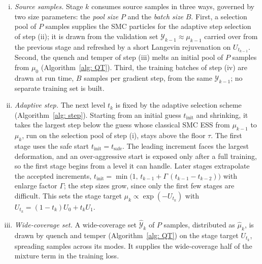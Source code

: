 \documentclass{article}
\begin{document}
\begin{enumerate}[(i)]
\item \emph{Source samples.} Stage $k$ consumes source samples in three ways, governed by two size parameters: the \emph{pool size} $P$ and the \emph{batch size} $B$. First, a selection pool of $P$ samples supplies the SMC particles for the adaptive step selection of step (ii); it is drawn from the validation set $\mathcal Y_{k-1}\approx\mu_{k-1}$ carried over from the previous stage and refreshed by a short Langevin rejuvenation on $U_{t_{k-1}}$. Second, the quench and temper of step (iii) melts an initial pool of $P$ samples from $\mu_0$ (Algorithm~\ref{alg: QT}). Third, the training batches of step (iv) are drawn at run time, $B$ samples per gradient step, from the same $\mathcal Y_{k-1}$; no separate training set is built.

\item \emph{Adaptive step.} The next level $t_k$ is fixed by the adaptive selection scheme (Algorithm~\ref{alg: step}). Starting from an initial guess $t_{\mathrm{init}}$ and shrinking, it takes the largest step below the guess whose classical SMC ESS from $\mu_{k-1}$ to $\mu_k$, run on the selection pool of step (i), stays above the floor $\tau$. The first stage uses the safe start $t_{\mathrm{init}} = t_{\mathrm{safe}}$. The leading increment faces the largest deformation, and an over-aggressive start is exposed only after a full training, so the first stage begins from a level it can handle. Later stages extrapolate the accepted increments, $t_{\mathrm{init}} = \min\bigl(1,\, t_{k-1} + \Gamma\,(t_{k-1} - t_{k-2})\bigr)$ with enlarge factor $\Gamma$; the step sizes grow, since only the first few stages are difficult. This sets the stage target $\mu_k \propto \exp(-U_{t_k})$ with $U_{t_k} = (1-t_k)U_0 + t_k U_1$.

\item \emph{Wide-coverage set.} A wide-coverage set $\hat{\mathcal Y}_k$ of $P$ samples, distributed as $\hat\mu_k$, is drawn by quench and temper (Algorithm~\ref{alg: QT}) on the stage target $U_{t_k}$, spreading samples across its modes. It supplies the wide-coverage half of the mixture term in the training loss.


\end{enumerate}
\end{document}
